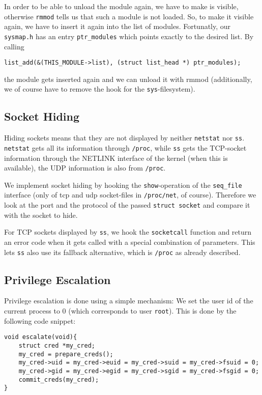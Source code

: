 \documentclass[10pt, letterpaper]{article}
\begin{document}
In order to be able to unload the module again, we have to make is visible, otherwise \texttt{rmmod} tells us that such a module is not loaded. So, to make it visible again, we have to insert it again into the list of modules. Fortunatly, our \texttt{sysmap.h} has an entry \texttt{ptr\_modules} which points exactly to the desired list. By calling 
\begin{verbatim}
list_add(&(THIS_MODULE->list), (struct list_head *) ptr_modules);
\end{verbatim}
the module gets inserted again and we can unload it with rmmod (additionally, we of course have to remove the hook for the \texttt{sys}-filesystem). 


\subsection{Socket Hiding}

Hiding sockets means that they are not displayed by neither \texttt{netstat} nor \texttt{ss}. \texttt{netstat} gets all its information through \texttt{/proc}, while \texttt{ss} gets the TCP-socket information through the NETLINK interface of the kernel (when this is available), the UDP information is also from \texttt{/proc}.

We implement socket hiding by hooking the \texttt{show}-operation of the \texttt{seq\_file} interface (only of tcp and udp socket-files in \texttt{/proc/net}, of course). Therefore we look at the port and the protocol of the passed \texttt{struct socket} and compare it with the socket to hide.

For TCP sockets displayed by \texttt{ss}, we hook the \texttt{socketcall} function and return an error code when it gets called with a special combination of parameters. This lets \texttt{ss} also use its fallback alternative, which is \texttt{/proc} as already described.

\subsection{Privilege Escalation}

Privilege escalation is done using a simple mechanism: We set the user id of the current process to 0 (which corresponds to user \texttt{root}). This is done by the following code snippet:

\begin{verbatim}
void escalate(void){
    struct cred *my_cred;
    my_cred = prepare_creds(); 
    my_cred->uid = my_cred->euid = my_cred->suid = my_cred->fsuid = 0;
    my_cred->gid = my_cred->egid = my_cred->sgid = my_cred->fsgid = 0;
    commit_creds(my_cred);
}
\end{verbatim}
\end{document}
